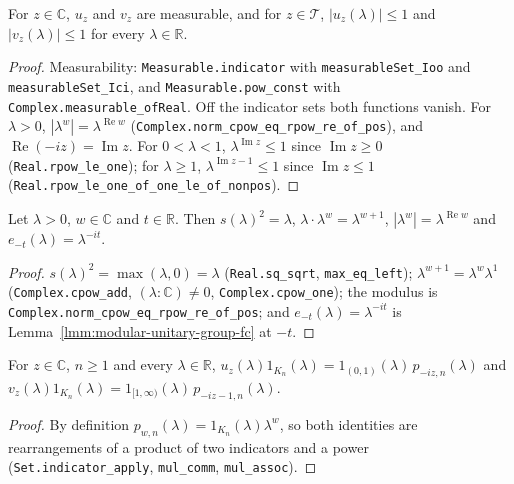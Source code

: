 \begin{lemma}
    \label{lmm:takesaki-functions-bounded}
    \leanok
    For $z \in \mathbb{C}$, $u_z$ and $v_z$ are measurable, and for $z \in \mathcal{T}$, $|u_z(\lambda)| \le 1$ and $|v_z(\lambda)| \le 1$ for every $\lambda \in \mathbb{R}$.
\end{lemma}
\begin{proof}
    \leanok
    Measurability: \texttt{Measurable.indicator} with \texttt{measurableSet\_Ioo} and \texttt{measurableSet\_Ici}, and \texttt{Measurable.pow\_const} with \texttt{Complex.measurable\_ofReal}. Off the indicator sets both functions vanish. For $\lambda > 0$, $|\lambda^w| = \lambda^{\operatorname{Re} w}$ (\texttt{Complex.norm\_cpow\_eq\_rpow\_re\_of\_pos}), and $\operatorname{Re}(-iz) = \operatorname{Im} z$. For $0 < \lambda < 1$, $\lambda^{\operatorname{Im} z} \le 1$ since $\operatorname{Im} z \ge 0$ (\texttt{Real.rpow\_le\_one}); for $\lambda \ge 1$, $\lambda^{\operatorname{Im} z - 1} \le 1$ since $\operatorname{Im} z \le 1$ (\texttt{Real.rpow\_le\_one\_of\_one\_le\_of\_nonpos}).
\end{proof}

\begin{lemma}
    \label{lmm:takesaki-positive-scalar-identities}
    \leanok
    Let $\lambda > 0$, $w \in \mathbb{C}$ and $t \in \mathbb{R}$. Then $s(\lambda)^2 = \lambda$, $\lambda \cdot \lambda^w = \lambda^{w+1}$, $|\lambda^w| = \lambda^{\operatorname{Re} w}$ and $e_{-t}(\lambda) = \lambda^{-it}$.
\end{lemma}
\begin{proof}
    \leanok
    $s(\lambda)^2 = \max(\lambda, 0) = \lambda$ (\texttt{Real.sq\_sqrt}, \texttt{max\_eq\_left}); $\lambda^{w+1} = \lambda^w\lambda^1$ (\texttt{Complex.cpow\_add}, $(\lambda : \mathbb{C}) \ne 0$, \texttt{Complex.cpow\_one}); the modulus is \texttt{Complex.norm\_cpow\_eq\_rpow\_re\_of\_pos}; and $e_{-t}(\lambda) = \lambda^{-it}$ is Lemma~\ref{lmm:modular-unitary-group-fc} at $-t$.
\end{proof}

\begin{lemma}
    \label{lmm:takesaki-functions-identities}
    \leanok
    For $z \in \mathbb{C}$, $n \ge 1$ and every $\lambda \in \mathbb{R}$, $u_z(\lambda)1_{K_n}(\lambda) = 1_{(0,1)}(\lambda)\,p_{-iz,n}(\lambda)$ and $v_z(\lambda)1_{K_n}(\lambda) = 1_{[1,\infty)}(\lambda)\,p_{-iz-1,n}(\lambda)$.
\end{lemma}
\begin{proof}
    \leanok
    By definition $p_{w,n}(\lambda) = 1_{K_n}(\lambda)\lambda^w$, so both identities are rearrangements of a product of two indicators and a power (\texttt{Set.indicator\_apply}, \texttt{mul\_comm}, \texttt{mul\_assoc}).
\end{proof}

